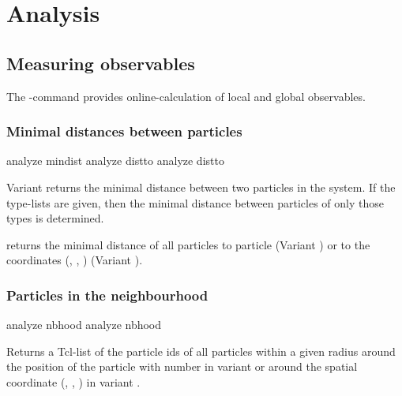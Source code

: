 \chapter{Analysis}
\label{chap:analysis}

\section{Measuring observables}

The -command provides online-calculation of local and
global observables.


\subsection{Minimal distances between particles}
\label{analyze:mindist}
\label{analyze:distto}

\begin{essyntax}
   analyze mindist 
   analyze distto 
   analyze distto   
\end{essyntax}

Variant  returns the minimal distance between two particles
in the system. If the type-lists are given, then the minimal distance
between particles of only those types is determined.

 returns the minimal distance of all particles to
particle  (Variant ) or to the coordinates
(, , ) (Variant ).

\subsection{Particles in the neighbourhood}
\label{analyze:nbhood}

\begin{essyntax}
  analyze nbhood  
  analyze nbhood   
\end{essyntax}
Returns a Tcl-list of the particle ids of all particles within a given
radius  around the position of the particle with number
 in variant  or around the spatial coordinate
(, , ) in variant .

